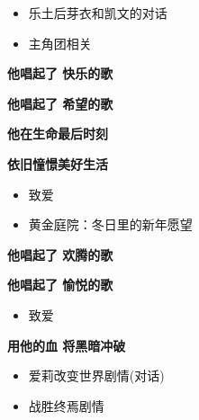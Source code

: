 \documentclass[a4paper]{article}
\begin{document}
\begin{itemize}
    \item 乐土后芽衣和凯文的对话
    \item 主角团相关
\end{itemize}

\textbf{他唱起了 快乐的歌}

\textbf{他唱起了 希望的歌}

\textbf{他在生命最后时刻}

\textbf{依旧憧憬美好生活}

\begin{itemize}
    \item 致爱
    \item 黄金庭院：冬日里的新年愿望
\end{itemize}

\textbf{他唱起了 欢腾的歌}

\textbf{他唱起了 愉悦的歌}

\begin{itemize}
    \item 致爱
\end{itemize}

\textbf{用他的血 将黑暗冲破}

\begin{itemize}
    \item 爱莉改变世界剧情(对话)
    \item 战胜终焉剧情
\end{itemize}
\end{document}
